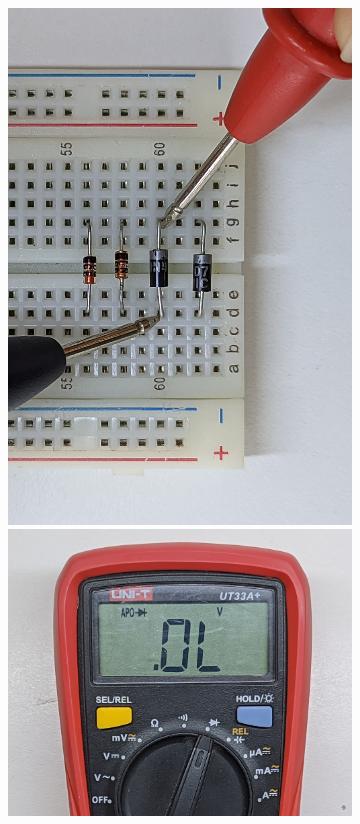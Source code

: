 \documentclass[chaptersright]{informeutn}
\begin{document}
\begin{figure}[!ht]
\begin{subfigure}[b]{1\textwidth}
\begin{minipage}[b]{0.24\textwidth}
        \end{minipage}
        \begin{minipage}[b]{0.24\textwidth}
          \centering
          \includegraphics[angle=-90, width=1\textwidth]{pictures/prot_diod-2i.jpg}
          \includegraphics[width=1\textwidth]{pictures/mult_diod-i.jpg}

\end{minipage}
\end{subfigure}
\end{figure}
\end{document}
